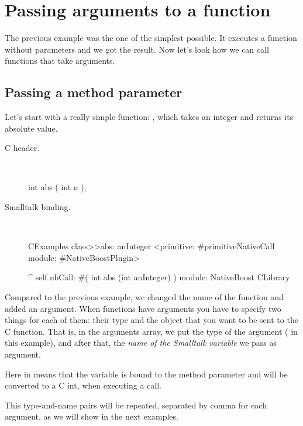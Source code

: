 \documentclass[a4paper,10pt,twoside]{book}
\begin{document}
\section{Passing arguments to a function}

The previous  example was the one of the simplest possible.
It executes a function without parameters and we got the result. 
Now let's look how we can call functions that take arguments. 

\subsection{Passing a method parameter}

Let's start with a really simple function: , which takes an integer and returns its absolute value.

\begin{description}
\item [C header.] \ 

\begin{code}{}
int abs ( int n );
\end{code}

\item [Smalltalk binding.] \ 

\begin{code}{}
CExamples class>>abs: anInteger
	<primitive: #primitiveNativeCall module: #NativeBoostPlugin>
	
	^ self nbCall: #( int abs (int anInteger) ) module: NativeBoost CLibrary
\end{code}

\end{description}


Compared to the previous example, we changed the name of the function and added an argument. 
When functions have arguments you have to specify two things for each of them:
their type and the object that you want to be sent to the C function. 
That is, in the arguments array, we put the type of the argument ( in this example), and after that, the \emph{name of the Smalltalk variable} we pass as argument. 

Here  in  means that the variable is bound to the  method parameter and will be converted to a C int, when executing a call. 

This type-and-name pairs will be repeated, separated by comma for each argument, as we will show in the next examples. 
\end{document}
